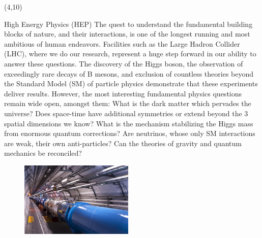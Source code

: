 \documentclass[final]{beamer}
\begin{document}
\begin{frame}{}
\begin{textblock}{38.0}(4,10)
\begin{block}{High Energy Physics (HEP)}
The quest to understand the fundamental building blocks of nature,
and their interactions, is one of the longest running and most
ambitious of human endeavors. Facilities such as the Large Hadron
Collider (LHC), where we do our research, represent a huge step
forward in our ability to answer these questions. The discovery of
the Higgs boson, the observation of exceedingly rare decays of B
mesons, and exclusion of countless theories beyond the Standard
Model (SM) of particle physics demonstrate that these experiments
deliver results. However, the most interesting fundamental physics
questions remain wide open, amongst them: What is the dark matter
which pervades the universe? Does space-time have additional
symmetries or extend beyond the 3 spatial dimensions we know? What
is the mechanism stabilizing the Higgs mass from enormous quantum
corrections? Are neutrinos, whose only SM interactions are weak,
their own anti-particles? Can the theories of gravity and quantum
mechanics be reconciled?
~~~ \\
\begin{figure}[tbph]
\centering
\includegraphics[width=0.48\textwidth]{images/0910152_02-A5-at-72-dpi.jpg}

\end{figure}
\end{block}
\end{textblock}
\end{frame}
\end{document}
